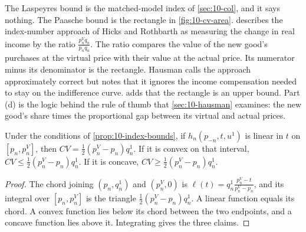 The Laspeyres bound is the matched-model index of \cref{sec:10-col}, and it says nothing. The Paasche bound is
the rectangle in \cref{fig:10-cv-area}. \citet[p.~212]{Hausman1997} describes the index-number approach of
Hicks and Rothbarth as measuring the change in real income by the ratio $\frac{p_n^Vq_n}{p_nq_n}$. The ratio
compares the value of the new good's purchases at the virtual price with their value at the actual price. Its
numerator minus its denominator is the rectangle. Hausman calls the approach approximately correct but notes
that it ignores the income compensation needed to stay on the indifference curve. 
adds that the rectangle is an upper bound. Part (d) is the logic behind the rule of thumb that
\cref{sec:10-hausman} examines: the new good's share times the proportional gap between its virtual and
actual prices.

\begin{corollary}\label{cor:10-half}
Under the conditions of \cref{prop:10-index-bounds}, if $h_n(p_{-n},t,u^1)$ is linear in $t$ on
$[p_n,p_n^V]$, then $CV = \frac{1}{2}(p_n^V - p_n)q_n^1$. If it is convex on that interval,
$CV \le \frac{1}{2}(p_n^V - p_n)q_n^1$. If it is concave, $CV \ge \frac{1}{2}(p_n^V - p_n)q_n^1$.
\end{corollary}

\begin{proof}
The chord joining $(p_n,q_n^1)$ and $(p_n^V,0)$ is $\ell(t) = q_n^1\frac{p_n^V - t}{p_n^V - p_n}$, and its
integral over $[p_n,p_n^V]$ is the triangle $\frac{1}{2}(p_n^V - p_n)q_n^1$. A linear function equals its
chord. A convex function lies below its chord between the two endpoints, and a concave function lies above
it. Integrating gives the three claims.
\end{proof}

